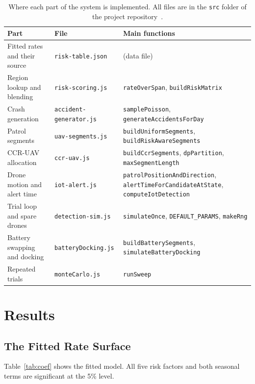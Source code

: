 \documentclass[11pt]{article}
\begin{document}
\begin{table}[htbp]
\centering
\caption{Where each part of the system is implemented. All files are in the
\texttt{src} folder of the project repository~\cite{thesiscode}.}
\label{tab:codemap}
\small
\begin{tabular}{@{}p{4.2cm}p{4.3cm}p{6.2cm}@{}}
\toprule
\textbf{Part} & \textbf{File} & \textbf{Main functions} \\
\midrule
Fitted rates and their source & \texttt{risk-table.json} & (data file) \\
Region lookup and blending & \texttt{risk-scoring.js} & \texttt{rateOverSpan}, \texttt{buildRiskMatrix} \\
Crash generation & \texttt{accident-generator.js} & \texttt{samplePoisson}, \texttt{generateAccidentsForDay} \\
Patrol segments & \texttt{uav-segments.js} & \texttt{buildUniformSegments}, \texttt{buildRiskAwareSegments} \\

CCR-UAV allocation & \texttt{ccr-uav.js} & \texttt{buildCcrSegments}, \texttt{dpPartition}, \texttt{maxSegmentLength} \\

Drone motion and alert time & \texttt{iot-alert.js} & \texttt{patrolPositionAndDirection}, \texttt{alertTimeForCandidateAtState}, \texttt{computeIotDetection} \\
Trial loop and spare drones & \texttt{detection-sim.js} & \texttt{simulateOnce}, \texttt{DEFAULT\_PARAMS}, \texttt{makeRng} \\
Battery swapping and docking & \texttt{batteryDocking.js} & \texttt{buildBatterySegments}, \texttt{simulateBatteryDocking} \\
Repeated trials & \texttt{monteCarlo.js} & \texttt{runSweep} \\
\bottomrule
\end{tabular}
\end{table}

\section{Results}

\subsection{The Fitted Rate Surface}

Table~\ref{tab:coef} shows the fitted model. All five risk factors and both
seasonal terms are significant at the 5\% level.
\end{document}
